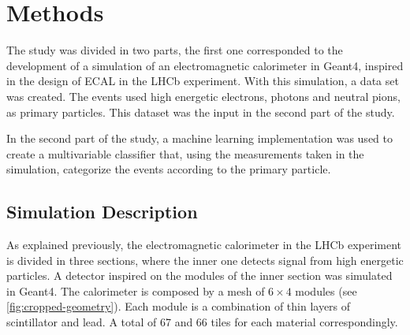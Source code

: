 \chapter{Methods}

The study was divided in two parts, the first one corresponded to the
development of a simulation of an electromagnetic calorimeter in Geant4,
inspired in the design of ECAL in the LHCb experiment. With this simulation, a
data set was created. The events used high energetic electrons, photons and
neutral pions, as primary particles. This dataset was the input in the second
part of the study.

In the second part of the study, a machine learning implementation was used to
create a multivariable classifier that, using the measurements taken in the
simulation, categorize the events according to the primary particle.

\section{Simulation Description}

As explained previously, the electromagnetic calorimeter in the LHCb experiment
is divided in three sections, where the inner one detects signal from high
energetic particles. A detector inspired on the modules of the inner section
was simulated in Geant4. The calorimeter is composed by a mesh of \(6\times4\)
modules (see \cref{fig:cropped-geometry}). Each module is a combination of thin
layers of scintillator and lead. A total of 67 and 66 tiles for each material
correspondingly.

